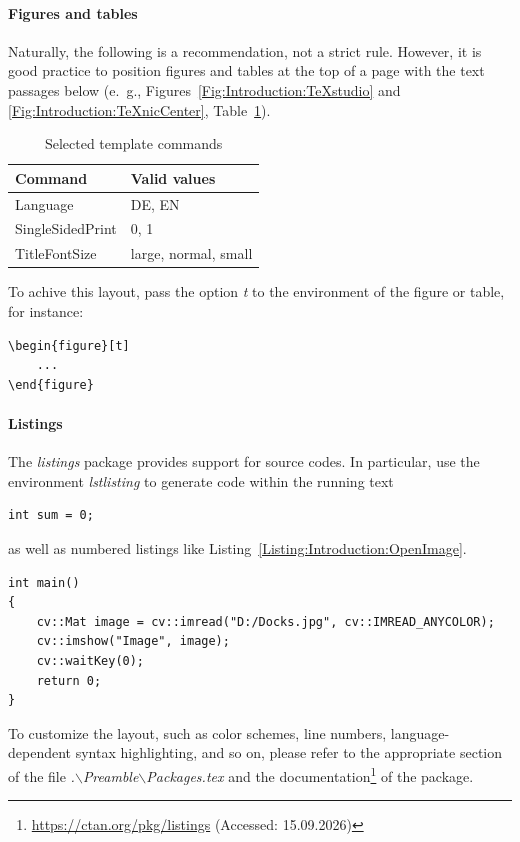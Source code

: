\paragraph{Figures and tables} Naturally, the following is a recommendation, not a strict rule. However, it is good practice to position figures and tables at the top of a page with the text passages below (e.~g., Figures~\ref{Fig:Introduction:TeXstudio} and \ref{Fig:Introduction:TeXnicCenter}, Table~\ref{Tab:Introduction:SelectedCommands}).
%
\begin{table}[t]
	\centering
	\small
	\caption{Selected template commands}
	\begin{tabular}{ll} \toprule
		\textbf{Command} & \textbf{Valid values} \\ \toprule
		Language & DE, EN \\ \midrule
		SingleSidedPrint & 0, 1\\ \midrule
		TitleFontSize & large, normal, small\\ \bottomrule
	\end{tabular}
	\label{Tab:Introduction:SelectedCommands}
\end{table}
%
To achive this layout, pass the option \emph{t} to the environment of the figure or table, for instance:
%
\begin{lstlisting}
\begin{figure}[t]
	...
\end{figure}
\end{lstlisting}


\paragraph{Listings} The \emph{listings} package provides support for source codes. In particular, use the environment \emph{lstlisting} to generate code within the running text
%
\begin{lstlisting}
int sum = 0;
\end{lstlisting}
%
as well as numbered listings like Listing~\ref{Listing:Introduction:OpenImage}.
%
\begin{lstlisting}[float=t,frame=t,captionpos=b,caption={Open and display an image},label={Listing:Introduction:OpenImage}]
int main()
{
	cv::Mat image = cv::imread("D:/Docks.jpg", cv::IMREAD_ANYCOLOR);
	cv::imshow("Image", image);
	cv::waitKey(0);
	return 0;
}
\end{lstlisting}
%
To customize the layout, such as color schemes, line numbers, language-dependent syntax highlighting, and so on, please refer to the appropriate section of the file \emph{.$\backslash$Preamble$\backslash$Packages.tex} and the documentation\footnote{\url{https://ctan.org/pkg/listings} (Accessed: 15.09.2026)} of the package.

